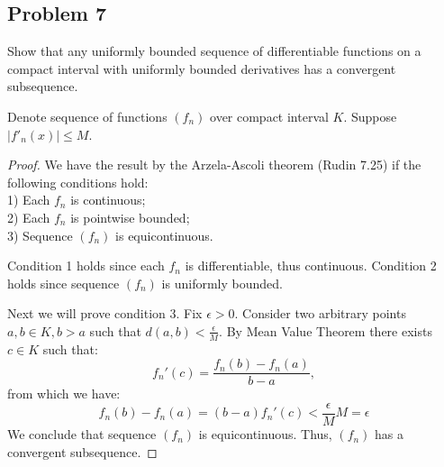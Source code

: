 \documentclass{article}
\begin{document}
\subsection*{Problem 7}

\begin{tcolorbox}
Show that any uniformly bounded sequence of differentiable functions on a compact interval with uniformly bounded derivatives has a convergent subsequence.
\end{tcolorbox}
Denote sequence of functions $(f_n)$ over compact interval $K$. Suppose $|f'_n(x)| \leq M$.
\begin{proof}
We have the result by the Arzela-Ascoli theorem (Rudin 7.25) if the following conditions hold:\\
1) Each $f_n$ is continuous;\\
2) Each $f_n$ is pointwise bounded;\\
3) Sequence $(f_n)$ is equicontinuous.

Condition 1 holds since each $f_n$ is differentiable, thus continuous. Condition 2 holds since sequence $(f_n)$ is uniformly bounded.

Next we will prove condition 3. Fix $\epsilon>0$. Consider two arbitrary points $a,b \in K, b > a$ such that $d(a,b) < \frac{\epsilon}{M}$. By Mean Value Theorem there exists $c \in K$ such that:
$$ f_n'(c) = \frac{f_n(b) - f_n(a)}{b - a}, $$
from which we have:
$$ f_n(b) - f_n(a) = (b - a) f_n'(c) < \frac{\epsilon}{M} M = \epsilon $$
We conclude that sequence $(f_n)$ is equicontinuous. Thus, $(f_n)$ has a convergent subsequence.
\end{proof}
\end{document}
